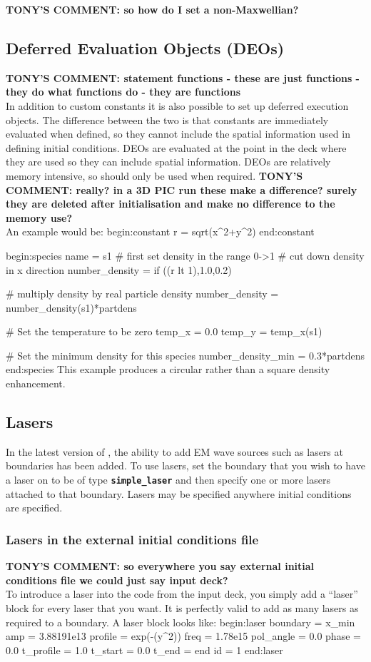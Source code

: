\documentclass[12pt,a4paper]{article}
\newcommand{\inlinecode}[1]{{\color{warwickred} \bf\texttt{#1}}}
\newcommand{\EPOCH}{{\color{warwickdark}\fontfamily{phv}\selectfont{EPOCH}}}
\newcommand{\tony}[1]{{\color{warwickred} \bf{TONY'S COMMENT:} \bf{#1}}\\}
\newenvironment{boxverbatim}{\lboxverbatim{none}}{\endlboxverbatim}
\begin{document}
\tony{so how do I set a non-Maxwellian?}

\subsection{Deferred Evaluation Objects (DEOs)}
\tony{statement functions - these are just functions - they do what functions
do - they are functions}
In addition to custom constants it is also possible to set up deferred
execution objects. The difference between the two is that constants are
immediately evaluated when defined, so they cannot include the spatial
information used in defining initial conditions. DEOs are evaluated at the
point in the deck where they are used so they can include spatial
information. DEOs are relatively memory intensive, so should only be used when
required.
\tony{really? in a 3D PIC run these make a difference? surely they are deleted
after initialisation and make no difference to the memory use?}
An example would be:
\begin{boxverbatim}
begin:constant
   r = sqrt(x^2+y^2)
end:constant

begin:species
   name = s1
   # first set density in the range 0->1
   # cut down density in x direction
   number_density = if ((r lt 1),1.0,0.2)

   # multiply density by real particle density
   number_density = number_density(s1)*partdens

   # Set the temperature to be zero
   temp_x = 0.0
   temp_y = temp_x(s1)

   # Set the minimum density for this species
   number_density_min = 0.3*partdens
end:species
\end{boxverbatim}
This example produces a circular rather than a square density enhancement.

\subsection{Lasers}
In the latest version of {\EPOCH}, the ability to add EM wave sources such as
lasers at boundaries has been added. To use lasers, set the boundary that you
wish to have a laser on to be of type \inlinecode{simple\_laser} and then
specify one or more lasers attached to that boundary. Lasers may be specified
anywhere initial conditions are specified.

\subsubsection{Lasers in the external initial conditions file}
\tony{so everywhere you say external initial conditions file we could just say
input deck?}
To introduce a laser into the code from the input deck, you simply add a
``laser'' block for every laser that you want. It is perfectly valid to add as
many lasers as required to a boundary. A laser block looks like:
\begin{boxverbatim}
begin:laser
   boundary = x_min
   amp = 3.88191e13
   profile = exp(-(y^2))
   freq = 1.78e15
   pol_angle = 0.0
   phase = 0.0
   t_profile = 1.0
   t_start = 0.0
   t_end = end
   id = 1
end:laser
\end{boxverbatim}
\end{document}
